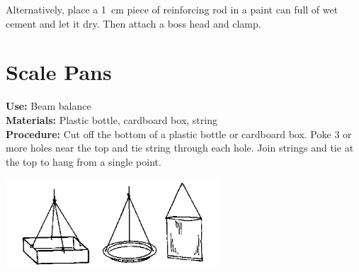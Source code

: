 \begin{multicols}{2}
Alternatively, place a 1~cm piece of reinforcing rod in a paint can full of wet cement and let it dry. Then attach a boss head and clamp.

\section{Scale Pans}
\label{sec:scale-pan}
\vspace{-10pt}
\textbf{Use:} Beam balance\\
\textbf{Materials:} Plastic bottle, cardboard box, string\\
\textbf{Procedure:} Cut off the bottom of a plastic bottle or cardboard box. Poke 3 or more holes near the top and tie string through each hole. Join strings and tie at the top to hang from a single point.
\begin{center}
\includegraphics[width=8cm]{./img/source/scale-pans.png}
\end{center}



\end{multicols}
